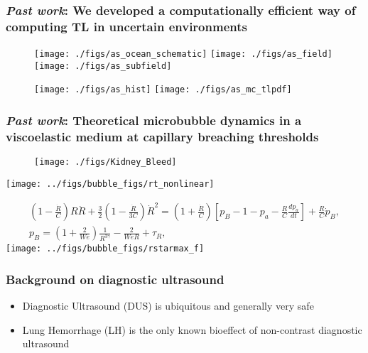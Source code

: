 \begin{frame} \frametitle{\textit{Past work}: We developed a computationally efficient way of computing TL in uncertain environments}
  \begin{figure}\hfill
    \texttt{[image: ./figs/as\_ocean\_schematic]}\hfill
    \texttt{[image: ./figs/as\_field]}\hfill
    \texttt{[image: ./figs/as\_subfield]}\hfill
  \end{figure}
  \begin{figure}\hfill
    \texttt{[image: ./figs/as\_hist]}\hfill
    \texttt{[image: ./figs/as\_mc\_tlpdf]}\hfill
  \end{figure}
\end{frame}
\begin{frame} \frametitle{\textit{Past work}: Theoretical microbubble dynamics in a viscoelastic medium at capillary breaching thresholds}
%
\begin{minipage}{0.3\textwidth}
    \begin{figure}
      \centering
      \texttt{[image: ./figs/Kidney\_Bleed]}
    \end{figure}
  \end{minipage}
  \begin{minipage}{0.6\textwidth}
    \texttt{[image: ../figs/bubble\_figs/rt\_nonlinear]}
  \end{minipage}
  \begin{minipage}{0.65\textwidth}
    {\tiny
      \begin{align*}
        \left(1-\frac{\dot{R}}{C}\right) R \ddot{R} + \frac{3}{2}\left(1-\frac{\dot{R}}{3 C}\right) \dot{R}^2 = \left(1+\frac{\dot{R}}{C}\right) \left[p_B- 1 -p_a -
        \frac{R}{C}\frac{dp_a}{dt}\right] +\frac{R}{C} \dot{p}_B,\\%
        p_B = \left(1+\frac{2}{We}\right)\frac{1}{R^{3\gamma}}-\frac{2}{WeR} + \tau_R,
      \end{align*}
    }
  \texttt{[image: ../figs/bubble\_figs/rstarmax\_f]}  
  \end{minipage}

\end{frame}
\begin{frame} \frametitle{Background on diagnostic ultrasound}
  \begin{itemize}
    \item Diagnostic Ultrasound (DUS) is ubiquitous and generally very safe
    \item Lung Hemorrhage (LH) is the only known bioeffect of non-contrast diagnostic ultrasound
  \end{itemize}
\end{frame}
